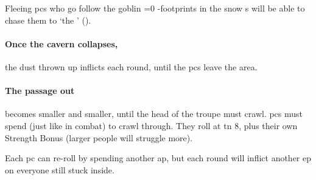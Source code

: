 \begin{multicols}{2}
Fleeing \glspl{pc} who go follow the goblin%
\ifnum\value{temperature}=0%
 -footprints in the snow
\else%
  s
\fi%
will be able to chase them to `the ' ().

\paragraph{Once the cavern collapses,}
the dust thrown up inflicts  each \gls{round}, until the \glspl{pc} leave the \gls{area}.

\paragraph{The passage out}
becomes smaller and smaller, until the head of the troupe must crawl.
\Glspl{pc} must spend  (just like in combat) to crawl through.
They roll  at \gls{tn} 8, plus their own Strength Bonus (larger people will struggle more).

Each \gls{pc} can re-roll by spending another \gls{ap}, but each \gls{round} will inflict another \gls{ep} on everyone still stuck inside.

\end{multicols}
